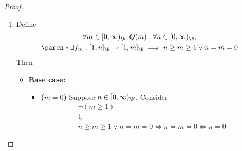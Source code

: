 \begin{proof}
\begin{enumerate}[label=\textbf{(\Alph*)}]
\begin{itemize}
\begin{itemize}
\[                          \]
                          By \cref{an:thm:properties-of-composition-functions,an:thm:properties-of-restriction-functions},
                          \[
                            \begin{array}{c}
                              f_{n}: [1, n]_{\N} \hookrightarrow [1, m - 1]_{\N} \\
                              \by{\ensuremath{P(n)} is true} \Downarrow          \\
                              n \leq m - 1                                       \\
                              \Downarrow                                         \\
                              n + 1 \leq m                                       \\
                            \end{array}
                          \]
                  \end{itemize}
                  Therefore, $P(n + 1)$ is true.
          \end{itemize}
          By \cref{an:thm:mathematical-induction},
          \[
            \forall n \in [0, \infty)_{\N}, P(n) \text{ is true}
          \]
    \item Define
          \[
            \begin{gathered}
              \forall m \in [0, \infty)_{\N}, Q(m): \forall n \in [0, \infty)_{\N}, \\ \paren*{\exists
                f_{m}: [1, n]_{\N} \twoheadrightarrow [1, m]_{\N}} \implies n \geq m \geq 1 \lor n = m = 0
            \end{gathered}
          \]
          Then
          \begin{itemize}
            \item \textbf{Base case:}
                  \begin{itemize}
                    \item \textbf{($m = 0$)} Suppose $n \in [0, \infty)_{\N}$. Consider
                          \[
                            \begin{array}{c}
                              \neg(m \geq 1) \\
                              \Downarrow     \\
                              n \geq m \geq 1 \lor n = m = 0 \iff n = m = 0 \iff n = 0
                            \end{array}
\]
\end{itemize}
\end{itemize}
\end{enumerate}
\end{proof}
